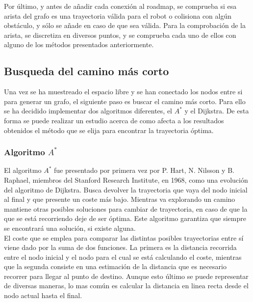 Por último, y antes de añadir cada conexión al roadmap, se comprueba si esa arista del grafo es una trayectoria válida para el robot o colisiona con algún obstáculo, y sólo se añade en caso de que sea válida. Para la comprobación de la arista, se discretiza en diversos puntos, y se comprueba cada uno de ellos con alguno de los métodos presentados anteriormente.\\

\subsection{Busqueda del camino más corto}

Una vez se ha muestreado el espacio libre y se han conectado los nodos entre si para generar un grafo, el siguiente paso es buscar el camino más corto. Para ello se ha decidido implementar dos algoritmos diferentes, el $A^*$ y el Dijkstra. De esta forma se puede realizar un estudio acerca de como afecta a los resultados obtenidos el método que se elija para encontrar la trayectoria óptima.\\

\subsubsection{Algoritmo $A^*$}

El algoritmo $A^*$ fue presentado por primera vez por P. Hart, N. Nilsson y B. Raphael, miembros del Stanford Research Institute, en 1968, como una evolución del algoritmo de Dijkstra. Busca devolver la trayectoria que vaya del nodo inicial al final y que presente un coste más bajo. Mientras va explorando un camino mantiene otras posibles soluciones para cambiar de trayectoria, en caso de que la que se está recorriendo deje de ser óptima. Este algoritmo garantiza que siempre se encontrará una solución, si existe alguna.\\

El coste que se emplea para comparar las distintas posibles trayectorias entre sí viene dado por la suma de dos funciones. La primera es la distancia recorrida entre el nodo inicial y el nodo para el cual se está calculando el coste, mientras que la segunda consiste en una estimación de la distancia que es necesario recorrer para llegar al punto de destino. Aunque esto último se puede representar de diversas maneras, lo mas común es calcular la distancia en linea recta desde el nodo actual hasta el final.\\

